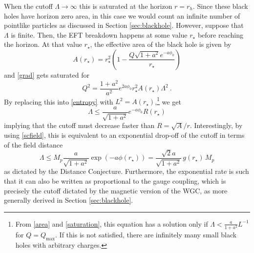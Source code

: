 \documentclass[11pt]{article}
\numberwithin{equation}{section}
\newcommand{\beq}{\begin{equation}}  \newcommand{\eeq}{\end{equation}}
\numberwithin{equation}{section}
\theoremstyle{remark}
\begin{document}
When the cutoff $\Lambda\rightarrow \infty$ this is saturated at the horizon $r=r_h$. Since these black holes have horizon zero area, in this case we would count an infinite number of pointlike particles as discussed in Section \ref{sec:blackhole}.  However, suppose that  $\Lambda$ is finite.
Then, the EFT breakdown happens at some value $r_\star$ before reaching the horizon.
At that value $r_\star$, the effective area of the black hole is given by
\beq
A(r_\star)=r_\star^2\left(1-\frac{Q\sqrt{1+a^2}e^{-a\phi_0}}{r_\star}\right) \label{area}
\eeq
and \eqref{grad} gets saturated for
\beq
Q^2=\frac{1+a^2}{a^2}e^{2a\phi_0}r_\star^2A(r_\star) \Lambda^2\ .\label{saturation}
\eeq
By replacing this into \eqref{entropy} with $L^2=A(r_\star)$,\footnote{From \eqref{area} and \eqref{saturation}, this equation has a solution only if $\Lambda < \frac{a}{1+a^2}L^{-1}$ for $Q=Q_\text{max}$. If this is not satisfied, there are infinitely many small black holes with arbitrary charges.} we get
\beq
\Lambda\leq \frac{a}{\sqrt{1+a^2}}e^{-a\phi_0}R(r_\star)
\eeq
implying that the cutoff must decrease faster than $R=\sqrt{A}/r$. Interestingly, by using \eqref{scfield}, this is equivalent to an exponential drop-off of the cutoff in terms of the field distance
\beq
\label{cutoff}
\Lambda \leq M_p\frac{a}{\sqrt{1+a^2}}\exp(-a\phi(r_\star))=\frac{\sqrt{2}a}{\sqrt{1+a^2}}\,g(r_\star)\,M_p
\eeq
as dictated by the Distance Conjecture. Furthermore, the exponential rate is such that it can also be written as proportional to the gauge coupling, which is precisely the cutoff dictated by the magnetic version of the WGC, as more generally derived in Section \ref{sec:blackhole}.
\end{document}
